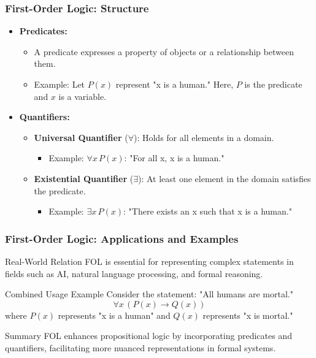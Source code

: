 \documentclass[aspectratio=169]{beamer}
\begin{document}
\begin{frame}[fragile]
    \frametitle{First-Order Logic: Structure}
    \begin{itemize}
        \item \textbf{Predicates:}
        \begin{itemize}
            \item A predicate expresses a property of objects or a relationship between them.
            \item Example: Let \( P(x) \) represent "x is a human." Here, \( P \) is the predicate and \( x \) is a variable.
        \end{itemize}
        
        \item \textbf{Quantifiers:}
        \begin{itemize}
            \item \textbf{Universal Quantifier} (\( \forall \)): Holds for all elements in a domain.
                \begin{itemize}
                    \item Example: \( \forall x \, P(x) \): "For all x, x is a human."
                \end{itemize}
            \item \textbf{Existential Quantifier} (\( \exists \)): At least one element in the domain satisfies the predicate.
                \begin{itemize}
                    \item Example: \( \exists x \, P(x) \): "There exists an x such that x is a human."
                \end{itemize}
        \end{itemize}
    \end{itemize}
\end{frame}

\begin{frame}[fragile]
    \frametitle{First-Order Logic: Applications and Examples}
    \begin{block}{Real-World Relation}
        FOL is essential for representing complex statements in fields such as AI, natural language processing, and formal reasoning.
    \end{block}

    \begin{block}{Combined Usage Example}
        Consider the statement: "All humans are mortal."
        \begin{equation}
            \forall x \, (P(x) \rightarrow Q(x))
        \end{equation}
        where \( P(x) \) represents "x is a human" and \( Q(x) \) represents "x is mortal."
    \end{block}
    
    \begin{block}{Summary}
        FOL enhances propositional logic by incorporating predicates and quantifiers, facilitating more nuanced representations in formal systems.
    \end{block}
\end{frame}
\end{document}
